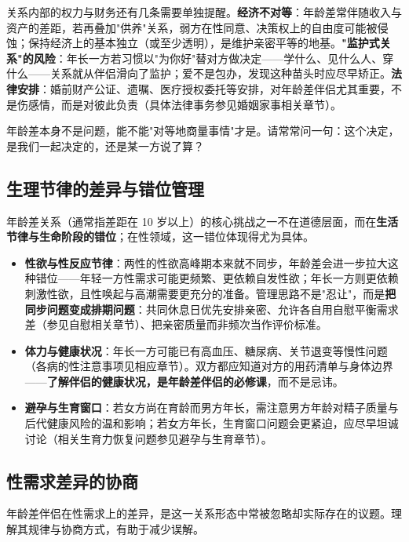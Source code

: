 关系内部的权力与财务还有几条需要单独提醒。\textbf{经济不对等}：年龄差常伴随收入与资产的差距，若再叠加"供养"关系，弱方在性同意、决策权上的自由度可能被侵蚀；保持经济上的基本独立（或至少透明），是维护亲密平等的地基。\textbf{"监护式关系"的风险}：年长一方若习惯以"为你好"替对方做决定——学什么、见什么人、穿什么——关系就从伴侣滑向了监护；爱不是包办，发现这种苗头时应尽早矫正。\textbf{法律安排}：婚前财产公证、遗嘱、医疗授权委托等安排，对年龄差伴侣尤其重要，不是伤感情，而是对彼此负责（具体法律事务参见婚姻家事相关章节）。

\begin{tcolorbox}[colback=pink!5!white,colframe=red!50!black,title=贴心小叮咛]
年龄差本身不是问题，能不能"对等地商量事情"才是。请常常问一句：这个决定，是我们一起决定的，还是某一方说了算？
\end{tcolorbox}
\subsection{生理节律的差异与错位管理}

年龄差关系（通常指差距在 10 岁以上）的核心挑战之一不在道德层面，而在\textbf{生活节律与生命阶段的错位}；在性领域，这一错位体现得尤为具体。

\begin{itemize}
\item \textbf{性欲与性反应节律}：两性的性欲高峰期本来就不同步，年龄差会进一步拉大这种错位——年轻一方性需求可能更频繁、更依赖自发性欲；年长一方则更依赖刺激性欲，且性唤起与高潮需要更充分的准备。管理思路不是"忍让"，而是\textbf{把同步问题变成排期问题}：共同休息日优先安排亲密、允许各自用自慰平衡需求差（参见自慰相关章节）、把亲密质量而非频次当作评价标准。
\item \textbf{体力与健康状况}：年长一方可能已有高血压、糖尿病、关节退变等慢性问题（各病的性注意事项见相应章节）。双方都应知道对方的用药清单与身体边界——\textbf{了解伴侣的健康状况，是年龄差伴侣的必修课}，而不是忌讳。
\item \textbf{避孕与生育窗口}：若女方尚在育龄而男方年长，需注意男方年龄对精子质量与后代健康风险的温和影响；若女方年长，生育窗口问题会更紧迫，应尽早坦诚讨论（相关生育力恢复问题参见避孕与生育章节）。
\end{itemize}
\subsection{性需求差异的协商}

年龄差伴侣在性需求上的差异，是这一关系形态中常被忽略却实际存在的议题。理解其规律与协商方式，有助于减少误解。

